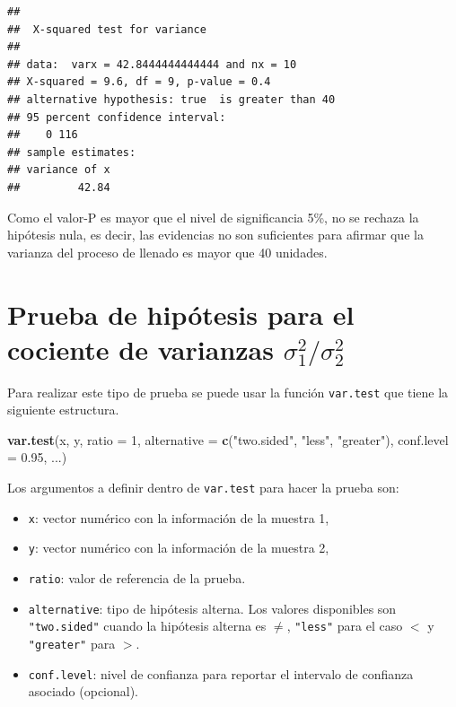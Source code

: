 \documentclass[10pt,]{krantz}
\makeatletter
\newenvironment{Shaded}{\begin{snugshade}}{\end{snugshade}}
\newcommand{\KeywordTok}[1]{\textcolor[rgb]{0.13,0.29,0.53}{\textbf{#1}}}
\newcommand{\DataTypeTok}[1]{\textcolor[rgb]{0.13,0.29,0.53}{#1}}
\newcommand{\DecValTok}[1]{\textcolor[rgb]{0.00,0.00,0.81}{#1}}
\newcommand{\FloatTok}[1]{\textcolor[rgb]{0.00,0.00,0.81}{#1}}
\newcommand{\StringTok}[1]{\textcolor[rgb]{0.31,0.60,0.02}{#1}}
\newcommand{\NormalTok}[1]{#1}
\providecommand{\tightlist}{%
  \setlength{\itemsep}{0pt}\setlength{\parskip}{0pt}}
\newenvironment{kframe}{%
\medskip{}
\setlength{\fboxsep}{.8em}
 \def\at@end@of@kframe{}%
 \ifinner\ifhmode%
  \def\at@end@of@kframe{\end{minipage}}%
  \begin{minipage}{\columnwidth}%
 \fi\fi%
 \def\FrameCommand##1{\hskip\@totalleftmargin \hskip-\fboxsep
 \colorbox{shadecolor}{##1}\hskip-\fboxsep
     \hskip-\linewidth \hskip-\@totalleftmargin \hskip\columnwidth}%
 \MakeFramed {\advance\hsize-\width
   \@totalleftmargin\z@ \linewidth\hsize
   \@setminipage}}%
 {\par\unskip\endMakeFramed%
 \at@end@of@kframe}
\renewenvironment{Shaded}{\begin{kframe}}{\end{kframe}}
\makeatother
\begin{document}
\begin{verbatim}
## 
##  X-squared test for variance
## 
## data:  varx = 42.8444444444444 and nx = 10
## X-squared = 9.6, df = 9, p-value = 0.4
## alternative hypothesis: true  is greater than 40
## 95 percent confidence interval:
##    0 116
## sample estimates:
## variance of x 
##         42.84
\end{verbatim}

Como el valor-P es mayor que el nivel de significancia 5\%, no se
rechaza la hipótesis nula, es decir, las evidencias no son suficientes
para afirmar que la varianza del proceso de llenado es mayor que 40
unidades.

\section{\texorpdfstring{Prueba de hipótesis para el cociente de
varianzas
\(\sigma_1^2 / \sigma_2^2\)}{Prueba de hipótesis para el cociente de varianzas \textbackslash{}sigma\_1\^{}2 / \textbackslash{}sigma\_2\^{}2}}\label{prueba-de-hipotesis-para-el-cociente-de-varianzas-sigma_12-sigma_22}

Para realizar este tipo de prueba se puede usar la función
\texttt{var.test} que tiene la siguiente estructura.

\begin{Shaded}
\begin{Highlighting}[]
\KeywordTok{var.test}\NormalTok{(x, y, }\DataTypeTok{ratio =} \DecValTok{1}\NormalTok{,}
         \DataTypeTok{alternative =} \KeywordTok{c}\NormalTok{(}\StringTok{"two.sided"}\NormalTok{, }\StringTok{"less"}\NormalTok{, }\StringTok{"greater"}\NormalTok{),}
         \DataTypeTok{conf.level =} \FloatTok{0.95}\NormalTok{, ...)}
\end{Highlighting}
\end{Shaded}

Los argumentos a definir dentro de \texttt{var.test} para hacer la
prueba son:

\begin{itemize}
\tightlist
\item
  \texttt{x}: vector numérico con la información de la muestra 1,
\item
  \texttt{y}: vector numérico con la información de la muestra 2,
\item
  \texttt{ratio}: valor de referencia de la prueba.
\item
  \texttt{alternative}: tipo de hipótesis alterna. Los valores
  disponibles son \texttt{"two.sided"} cuando la hipótesis alterna es
  \(\neq\), \texttt{"less"} para el caso \(<\) y \texttt{"greater"} para
  \(>\).
\item
  \texttt{conf.level}: nivel de confianza para reportar el intervalo de
  confianza asociado (opcional).
\end{itemize}
\end{document}
